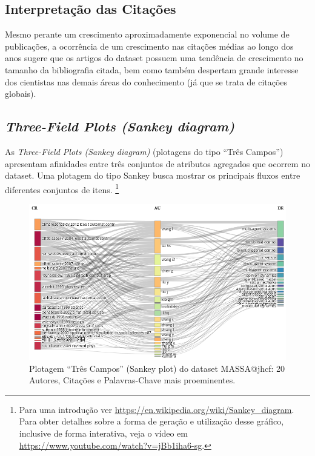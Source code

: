\subsection{Interpretação das Citações}
Mesmo perante um crescimento aproximadamente exponencial no volume de publicações, a ocorrência de um crescimento nas citações médias ao longo dos anos sugere que os artigos do dataset possuem uma tendência de crescimento no tamanho da bibliografia citada, bem como também despertam grande interesse dos cientistas nas demais áreas do conhecimento (já que se trata de citações globais).

\subsection{\textit{Three-Field Plots (Sankey diagram)}}

As \textit{Three-Field Plots (Sankey diagram)} (plotagens do tipo ``Três Campos'') apresentam afinidades entre três conjuntos de atributos agregados que ocorrem no dataset. Uma plotagem do tipo Sankey busca mostrar os principais fluxos entre diferentes conjuntos de itens. \footnote{Para uma introdução ver \url{https://en.wikipedia.org/wiki/Sankey_diagram}. Para obter detalhes sobre a forma de geração e utilização desse gráfico, inclusive de forma interativa, veja o vídeo em \url{https://www.youtube.com/watch?v=jBb1iha6-sg}.} 

\begin{figure}
    \centering
    \includegraphics[angle=0,width=1\textwidth]{experiments/jhcf/PesqBibliogr/Computacao Experimental/WoS-20210803/classico-mais-citacoes/Dataset/ThreeFieldPlot-AU-CR-DE-20-20-20.png}
    \caption{Plotagem ``Três Campos'' (Sankey plot) do dataset MASSA@jhcf: 20 Autores, Citações e Palavras-Chave mais proeminentes.}
    \label{fig:MASSA@jhcf:ThreeFieldPlot}
\end{figure}


